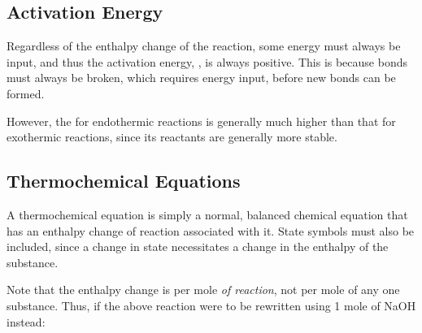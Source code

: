 

		\pagebreak
		\subsection{Activation Energy}

			Regardless of the enthalpy change of the reaction, some energy must always be input, and thus the activation energy, \ea, is
			always positive. This is because bonds must always be broken, which requires energy input, before new bonds can be formed.

			However, the \ea for endothermic reactions is generally much higher than that for exothermic reactions, since its reactants
			are generally more stable.


		\subsection{Thermochemical Equations}

			A thermochemical equation is simply a normal, balanced chemical equation that has an enthalpy change of reaction associated with
			it. State symbols must also be included, since a change in state necessitates a change in the enthalpy of the substance.


			Note that the enthalpy change is per mole \textit{of reaction}, not per mole of any one substance. Thus, if the above reaction
			were to be rewritten using 1 mole of NaOH instead:


